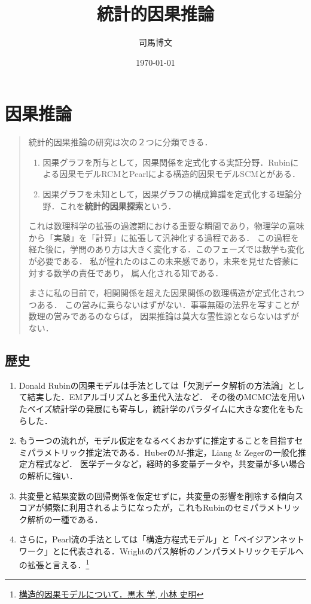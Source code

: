 \documentclass[uplatex,dvipdfmx]{jsreport}
\title{統計的因果推論}
\author{司馬博文}
\date{\today}
\begin{document}
\tableofcontents

\chapter{因果推論}

\begin{quotation}
    統計的因果推論の研究は次の２つに分類できる．
    \begin{enumerate}
        \item 因果グラフを所与として，因果関係を定式化する実証分野．Rubinによる因果モデルRCMとPearlによる構造的因果モデルSCMとがある．
        \item 因果グラフを未知として，因果グラフの構成算譜を定式化する理論分野．これを\textbf{統計的因果探索}という．
    \end{enumerate}
    これは数理科学の拡張の過渡期における重要な瞬間であり，物理学の意味から「実験」を「計算」に拡張して汎神化する過程である．
    この過程を経た後に，学問のあり方は大きく変化する．このフェーズでは数学も変化が必要である．
    私が憧れたのはこの未来感であり，未来を見せた啓蒙に対する数学の責任であり，
    属人化される知である．

    まさに私の目前で，相関関係を超えた因果関係の数理構造が定式化されつつある．
    この営みに乗らないはずがない．事事無礙の法界を写すことが数理の営みであるのならば，
    因果推論は莫大な霊性源とならないはずがない．
\end{quotation}

\section{歴史}

\begin{history}[調査観察データに対する因果推論の潮流]\mbox{}
    \begin{enumerate}
        \item Donald Rubinの因果モデルは手法としては「欠測データ解析の方法論」として結実した．EMアルゴリズムと多重代入法など．
        その後のMCMC法を用いたベイズ統計学の発展にも寄与し，統計学のパラダイムに大きな変化をもたらした．
        \item もう一つの流れが，モデル仮定をなるべくおかずに推定することを目指すセミパラメトリック推定法である．Huberの$M$-推定，Liang \& Zegerの一般化推定方程式など．
        医学データなど，経時的多変量データや，共変量が多い場合の解析に強い．
        \item 共変量と結果変数の回帰関係を仮定せずに，共変量の影響を削除する傾向スコアが頻繁に利用されるようになったが，これもRubinのセミパラメトリック解析の一種である．
        \item さらに，Pearl流の手法としては「構造方程式モデル」と「ベイジアンネットワーク」とに代表される．Wrightのパス解析のノンパラメトリックモデルへの拡張と言える．\footnote{\href{https://www.jstage.jst.go.jp/article/jjb/32/2/32_119/_article/-char/ja/}{構造的因果モデルについて．黒木 学, 小林 史明}}
    \end{enumerate}
\end{history}
\end{document}

